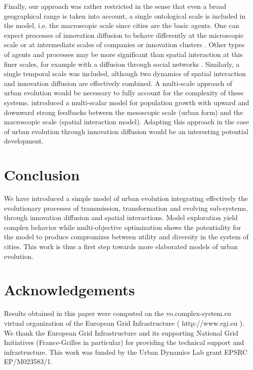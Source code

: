 \documentclass[letterpaper]{article}
\begin{document}
Finally, our approach was rather restricted in the sense that even a broad geographical range is taken into account, a single ontological scale is included in the model, i.e. the macroscopic scale since cities are the basic agents. One can expect processes of innovation diffusion to behave differently at the microscopic scale or at intermediate scales of companies or innovation clusters \cite{audretsch2004knowledge}. Other types of agents and processes may be more significant than spatial interaction at this finer scales, for example with a diffusion through social networks \citep{zhang2019empirically}. Similarly, a single temporal scale was included, although two dynamics of spatial interaction and innovation diffusion are effectively combined. A multi-scale approach of urban evolution would be necessary to fully account for the complexity of these systems. \cite{raimbault:halshs-02351722} introduced a multi-scalar model for population growth with upward and downward strong feedbacks between the mesoscopic scale (urban form) and the macroscopic scale (spatial interaction model). Adapting this approach in the case of urban evolution through innovation diffusion would be an interesting potential development.


\section{Conclusion}

We have introduced a simple model of urban evolution integrating effectively the evolutionary processes of transmission, transformation and evolving sub-systems, through innovation diffusion and spatial interactions. Model exploration yield complex behavior while multi-objective optimization shows the potentiality for the model to produce compromizes between utility and diversity in the system of cities. This work is thus a first step towards more elaborated models of urban evolution.


\bigskip

\section{Acknowledgements}

Results obtained in this paper were computed on the vo.complex-system.eu virtual organization of the European Grid Infrastructure ( http://www.egi.eu ). We thank the European Grid Infrastructure and its supporting National Grid Initiatives (France-Grilles in particular) for providing the technical support and infrastructure. This work was funded by the Urban Dynamics Lab grant EPSRC EP/M023583/1.

\bigskip

\footnotesize

\end{document}
